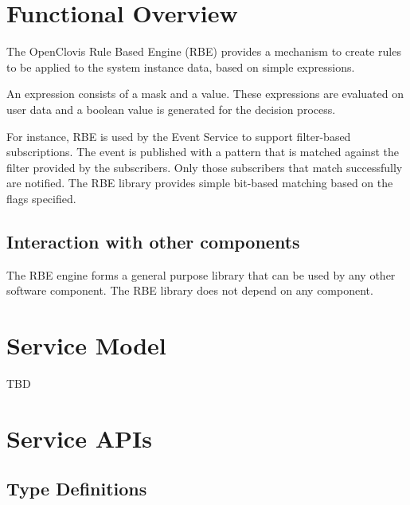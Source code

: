\hypertarget{group__group41}{
\chapter{Functional Overview}
\label{group__group41}
}


\begin{flushleft}
The OpenClovis Rule Based Engine (RBE) provides a mechanism to create rules to be applied to the system instance data, based on simple 
expressions. \par
 \par
 An expression consists of a mask and a value. These expressions are evaluated on user data and a boolean value is generated for the decision process. \par
 \par
 For instance, RBE is used by the Event Service to support filter-based subscriptions. The event is published with a pattern that is matched against 
 the filter provided by the subscribers. Only those subscribers that match successfully are notified. The RBE library provides simple bit-based matching 
 based on the flags specified.
\section {Interaction with other components} The RBE engine forms a general purpose library that can be used by any other software component. The RBE
library does not depend on any component.

\chapter{Service Model}
TBD

\chapter{Service APIs}

\section{Type Definitions}

\end{flushleft}
